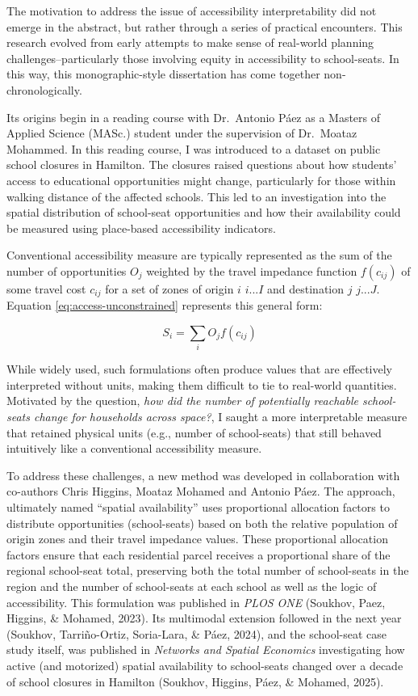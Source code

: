 \documentclass[
11pt, %
oneside, %
english, %
singlespacing, %
]{macthesis} %
\begin{document}
The motivation to address the issue of accessibility interpretability did not emerge in the abstract, but rather through a series of practical encounters. This research evolved from early attempts to make sense of real-world planning challenges--particularly those involving equity in accessibility to school-seats. In this way, this monographic-style dissertation has come together non-chronologically.

Its origins begin in a reading course with Dr.~Antonio Páez as a Masters of Applied Science (MASc.) student under the supervision of Dr.~Moataz Mohammed. In this reading course, I was introduced to a dataset on public school closures in Hamilton. The closures raised questions about how students' access to educational opportunities might change, particularly for those within walking distance of the affected schools. This led to an investigation into the spatial distribution of school-seat opportunities and how their availability could be measured using place-based accessibility indicators.

Conventional accessibility measure are typically represented as the sum of the number of opportunities \(O_j\) weighted by the travel impedance function \(f(c_{ij})\) of some travel cost \(c_{ij}\) for a set of zones of origin \(i\) \(i...I\) and destination \(j\) \(j...J\). Equation \ref{eq:access-unconstrained} represents this general form:

\begin{equation}
\label{eq:access-unconstrained}
S_i = \sum_i O_j f(c_{ij}) 
\end{equation} 

While widely used, such formulations often produce values that are effectively interpreted without units, making them difficult to tie to real-world quantities. Motivated by the question, \emph{how did the number of potentially reachable school-seats change for households across space?}, I saught a more interpretable measure that retained physical units (e.g., number of school-seats) that still behaved intuitively like a conventional accessibility measure.

To address these challenges, a new method was developed in collaboration with co-authors Chris Higgins, Moataz Mohamed and Antonio Páez. The approach, ultimately named ``spatial availability'' uses proportional allocation factors to distribute opportunities (school-seats) based on both the relative population of origin zones and their travel impedance values. These proportional allocation factors ensure that each residential parcel receives a proportional share of the regional school-seat total, preserving both the total number of school-seats in the region and the number of school-seats at each school as well as the logic of accessibility. This formulation was published in \emph{PLOS ONE} (Soukhov, Paez, Higgins, \& Mohamed, 2023). Its multimodal extension followed in the next year (Soukhov, Tarriño-Ortiz, Soria-Lara, \& Páez, 2024), and the school-seat case study itself, was published in \emph{Networks and Spatial Economics} investigating how active (and motorized) spatial availability to school-seats changed over a decade of school closures in Hamilton (Soukhov, Higgins, Páez, \& Mohamed, 2025).
\end{document}
